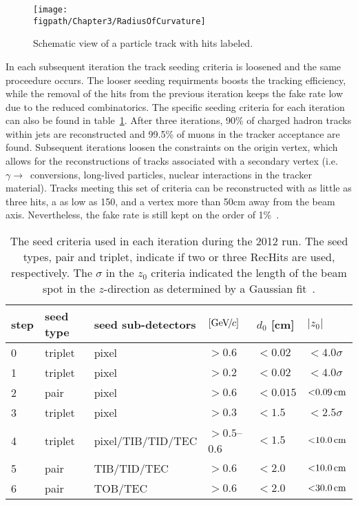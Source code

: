 \begin{figure}[!hbt]
	\centering
	\texttt{[image: \\figpath/Chapter3/RadiusOfCurvature]}
	\caption{Schematic view of a particle track with hits labeled.}
	\label{fig:radius_of_curvature}
\end{figure}

In each subsequent iteration the track seeding criteria is loosened and the same proceedure occurs.
The looser seeding requirments boosts the tracking efficiency, while the removal of the hits from the previous iteration keeps the fake rate low due to the reduced combinatorics.
The specific seeding criteria for each iteration can also be found in table~\ref{tab:track_seeding}.
After three iterations, 90\% of charged hadron tracks within jets are reconstructed and 99.5\% of muons in the tracker acceptance are found.
Subsequent iterations loosen the constraints on the origin vertex, which allows for the reconstructions of tracks associated with a secondary vertex (i.e. $\gamma\rightarrow$\Pep\Pem~conversions, long-lived particles, nuclear interactions in the tracker material).
Tracks meeting this set of criteria can be reconstructed with as little as three hits, a \pt as low as 150\mev, and a vertex  more than 50\unit{cm} away from the beam axis.
Nevertheless, the fake rate is still kept on the order of 1\%~\cite{CMS-PAS-PFT-09-001}.

\begin{table}[htbp]
	\caption{The seed criteria used in each iteration during the 2012 run. The seed types, pair and triplet, indicate if two or three RecHits are used, respectively. The $\sigma$ in the $z_0$ criteria indicated the length of the beam spot in the $z$-direction as determined by a Gaussian fit~\cite{Tracking2012}.}
	\centering
    \begin{tabular}{llllll}
		\hline
		step  & seed type & seed sub-detectors & \pt $[{\text{Ge\hspace{-.08em}V\hspace{-0.16em}/\hspace{-0.08em}}c}]$ & $d_0$ [cm] & $|z_0|$ \\
		\hline
		0     & triplet   & pixel             & ${>}0.6$     & ${<}0.02$  & ${<}4.0\sigma$ \\
		1     & triplet   & pixel             & ${>}0.2$     & ${<}0.02$  & ${<}4.0\sigma$ \\
		2     & pair      & pixel             & ${>}0.6$     & ${<}0.015$ & ${<}0.09\,\text{cm}$ \\
		3     & triplet   & pixel             & ${>}0.3$     & ${<}1.5$   & ${<}2.5\sigma$ \\
		4     & triplet   & pixel/TIB/TID/TEC & ${>}0.5$--0.6 & ${<}1.5$   & ${<}10.0\,\text{cm}$ \\
		5     & pair      & TIB/TID/TEC       & ${>}0.6$     & ${<}2.0$   & ${<}10.0\,\text{cm}$ \\
		6     & pair      & TOB/TEC           & ${>}0.6$     & ${<}2.0$   & ${<}30.0\,\text{cm}$ \\
		\hline
    \end{tabular}
	\label{tab:track_seeding}
\end{table}

